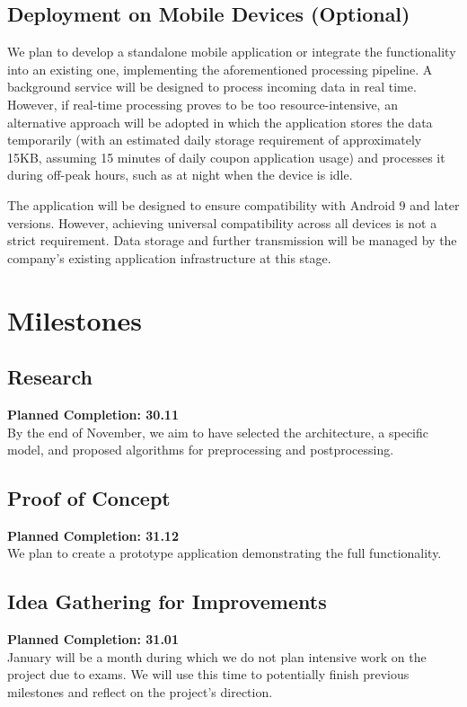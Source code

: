 \documentclass[12pt]{article}
\begin{document}
\subsection*{Deployment on Mobile Devices (Optional)}
We plan to develop a standalone mobile application or integrate the functionality into an existing one, implementing the aforementioned processing pipeline. A background service will be designed to process incoming data in real time. However, if real-time processing proves to be too resource-intensive, an alternative approach will be adopted in which the application stores the data temporarily (with an estimated daily storage requirement of approximately 15KB, assuming 15 minutes of daily coupon application usage) and processes it during off-peak hours, such as at night when the device is idle.

The application will be designed to ensure compatibility with Android 9 and later versions. However, achieving universal compatibility across all devices is not a strict requirement. Data storage and further transmission will be managed by the company’s existing application infrastructure at this stage.


\section*{Milestones}

\subsection*{Research}
\textbf{Planned Completion: 30.11}\\
By the end of November, we aim to have selected the architecture, a specific model, and proposed algorithms for preprocessing and postprocessing.

\subsection*{Proof of Concept}
\textbf{Planned Completion: 31.12}\\
We plan to create a prototype application demonstrating the full functionality.

\subsection*{Idea Gathering for Improvements}
\textbf{Planned Completion: 31.01}\\
January will be a month during which we do not plan intensive work on the project due to exams. We will use this time to potentially finish previous milestones and reflect on the project's direction.
\end{document}
